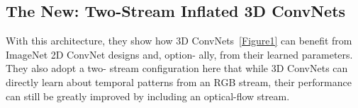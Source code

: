 \documentclass[10pt,twocolumn,letterpaper]{article}
\begin{document}
\subsection{The New: Two-Stream Inflated 3D ConvNets}
With this architecture, they show how 3D ConvNets~\ref{Figure1} can
benefit from ImageNet 2D ConvNet designs and, option-
ally, from their learned parameters. They also adopt a two-
stream configuration here that while 3D ConvNets can directly learn about temporal patterns from an RGB stream, their performance can still be
greatly improved by including an optical-flow stream.


\end{document}
